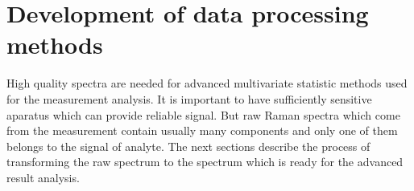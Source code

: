 \section{Development of data processing methods}

High quality spectra are needed for advanced multivariate statistic methods
used for the measurement analysis.
It is important to have sufficiently sensitive aparatus which can provide
reliable signal.
But raw Raman spectra which come from the measurement contain usually many
components and only one of them belongs to the signal of analyte.
The next sections describe the process of transforming the raw spectrum
to the spectrum which is ready for the advanced result analysis.








